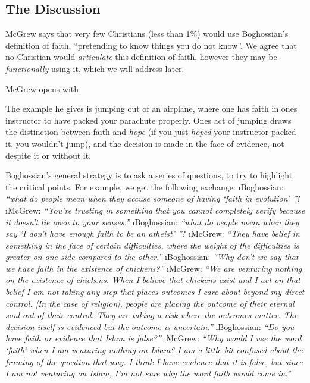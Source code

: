 \subsection{The Discussion}

McGrew says that very few Christians (less than 1\%) would use Boghossian's definition of faith, ``pretending to know things you do not know''.  We agree that no Christian would \emph{articulate} this definition of
faith, however they may be \emph{functionally} using it, which we will
address later.

McGrew opens with 

The example he gives is jumping out of an airplane, where one has
faith in ones instructor to have packed your parachute properly. Ones
act of jumping draws the distinction between faith and {\em hope} (if you just {\em hoped} your instructor packed it, you wouldn't jump), and the decision is made in the face of evidence, not despite it or without it.

Boghossian's general strategy is to ask a series of questions, to try to highlight the critical points.  For example, we get the following exchange:
\bi
\i Boghossian: {\em ``what do people mean when they accuse someone of having
`faith in evolution' ''}?
\i McGrew: {\em ``You're trusting in something that you cannot completely verify because it doesn't lie open to your senses.''}
\i Boghossian: {\em ``what do people mean when they say `I don't have enough
faith to be an atheist' ''}?
\i McGrew: {\em ``They have belief in something in the face of certain difficulties, where the weight of the difficulties is greater on one side compared to the other.''}
\i Boghossian: {\em ``Why don't we say that we have faith in the
existence of chickens?''}
\i McGrew:  {\em ``We are venturing nothing on the existence of chickens. When I believe that chickens exist and I act on that belief I am not taking any step that places outcomes I care about beyond my direct control. [In the case of religion], people are placing the outcome of their eternal soul out of their control. They are taking a risk where the outcomes matter. The decision itself is evidenced but the outcome is
uncertain.''}
\i Boghossian: {\em ``Do you have faith or evidence that Islam is
false?''}
\i McGrew: {\em ``Why would I use the word `faith' when I am venturing nothing on Islam?
I am a little bit confused about the framing of the question that way. I
think I have evidence that it is false, but since I am not venturing on
Islam, I'm not sure why the word faith would come in.''}
\ei


